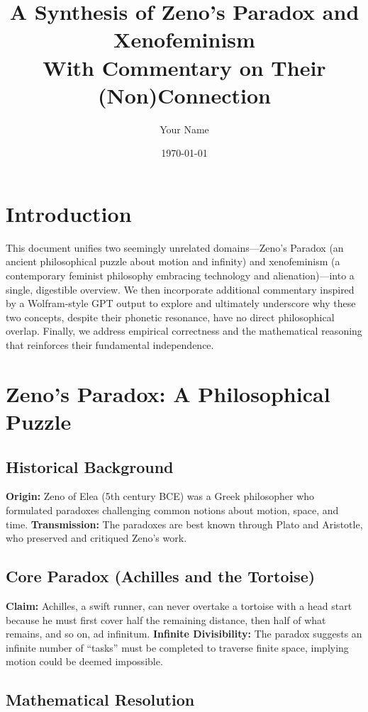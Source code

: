 \documentclass[12pt]{article}
\title{\textbf{A Synthesis of Zeno’s Paradox and Xenofeminism \\ 
\large With Commentary on Their (Non)Connection}}
\author{Your Name}
\date{\today}
\begin{document}
\maketitle
\tableofcontents
\newpage

\section{Introduction}

This document unifies two seemingly unrelated domains---Zeno’s Paradox (an ancient philosophical puzzle about motion and infinity) and xenofeminism (a contemporary feminist philosophy embracing technology and alienation)---into a single, digestible overview. We then incorporate additional commentary inspired by a Wolfram-style GPT output to explore and ultimately underscore why these two concepts, despite their phonetic resonance, have no direct philosophical overlap. Finally, we address empirical correctness and the mathematical reasoning that reinforces their fundamental independence.

\section{Zeno’s Paradox: A Philosophical Puzzle}

\subsection{Historical Background}

\textbf{Origin:} Zeno of Elea (5th century BCE) was a Greek philosopher who formulated paradoxes challenging common notions about motion, space, and time.  
\textbf{Transmission:} The paradoxes are best known through Plato and Aristotle, who preserved and critiqued Zeno’s work.

\subsection{Core Paradox (Achilles and the Tortoise)}

\textbf{Claim:} Achilles, a swift runner, can never overtake a tortoise with a head start because he must first cover half the remaining distance, then half of what remains, and so on, ad infinitum.  
\textbf{Infinite Divisibility:} The paradox suggests an infinite number of ``tasks'' must be completed to traverse finite space, implying motion could be deemed impossible.

\subsection{Mathematical Resolution}
\end{document}
